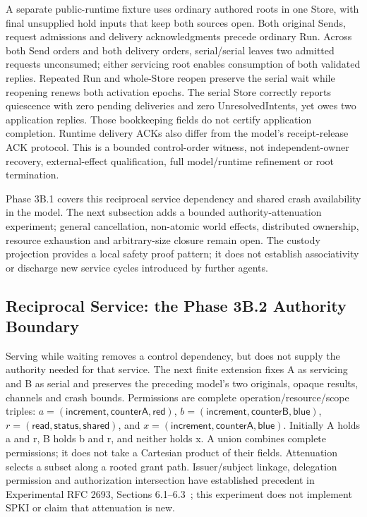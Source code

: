 \documentclass[11pt,a4paper]{article}
\theoremstyle{definition}
\theoremstyle{remark}
\begin{document}
A separate public-runtime fixture uses ordinary authored roots in one Store, with final unsupplied hold inputs that keep both sources open. Both original Sends, request admissions and delivery acknowledgments precede ordinary Run. Across both Send orders and both delivery orders, serial/serial leaves two admitted requests unconsumed; either servicing root enables consumption of both validated replies. Repeated Run and whole-Store reopen preserve the serial wait while reopening renews both activation epochs. The serial Store correctly reports quiescence with zero pending deliveries and zero UnresolvedIntents, yet owes two application replies. Those bookkeeping fields do not certify application completion. Runtime delivery ACKs also differ from the model's receipt-release ACK protocol. This is a bounded control-order witness, not independent-owner recovery, external-effect qualification, full model/runtime refinement or root termination.

Phase 3B.1 covers this reciprocal service dependency and shared crash availability in the model. The next subsection adds a bounded authority-attenuation experiment; general cancellation, non-atomic world effects, distributed ownership, resource exhaustion and arbitrary-size closure remain open. The custody projection provides a local safety proof pattern; it does not establish associativity or discharge new service cycles introduced by further agents.

\subsection{Reciprocal Service: the Phase 3B.2 Authority Boundary}

Serving while waiting removes a control dependency, but does not supply the authority needed for that service. The next finite extension fixes A as servicing and B as serial and preserves the preceding model's two originals, opaque results, channels and crash bounds. Permissions are complete operation/resource/scope triples: $a=(\mathsf{increment},\mathsf{counterA},\mathsf{red})$, $b=(\mathsf{increment},\mathsf{counterB},\mathsf{blue})$, $r=(\mathsf{read},\mathsf{status},\mathsf{shared})$, and $x=(\mathsf{increment},\mathsf{counterA},\mathsf{blue})$. Initially A holds a and r, B holds b and r, and neither holds x. A union combines complete permissions; it does not take a Cartesian product of their fields. Attenuation selects a subset along a rooted grant path. Issuer/subject linkage, delegation permission and authorization intersection have established precedent in Experimental RFC 2693, Sections 6.1--6.3~\cite{ellison1999spki}; this experiment does not implement SPKI or claim that attenuation is new.
\end{document}
